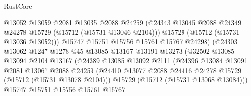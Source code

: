 \begin{lexlean}{RustCore}
\begin{coremodule}
                                  @13052
                                  @13059
                                  @2081
                                  @13035
                                  @2088
                                  @24259
                                  (@24343
                                    @13045
                                    @2088
                                    @24349
                                    @24278
                                    @15729
                                    (@15712 (@15731 @13046 @2104)))
                                  @15729
                                  (@15712 (@15731 @13036 @13052)))
                                @15747
                                @15751
                                @15756
                                @15761
                                @15767
                                @24298)
                              (@24303
                                @13062
                                @1247
                                @1278
                                @45
                                @13085
                                @13167
                                @13191
                                @13273
                                (@32502
                                  @13085
                                  @13094
                                  @2104
                                  @13167
                                  (@24389
                                    @13085
                                    @13092
                                    @2111
                                    (@24396
                                      @13084
                                      @13091
                                      @2081
                                      @13067
                                      @2088
                                      @24259
                                      (@24410
                                        @13077
                                        @2088
                                        @24416
                                        @24278
                                        @15729
                                        (@15712 (@15731 @13078 @2104)))
                                      @15729
                                      (@15712 (@15731 @13068 @13084)))
                                    @15747
                                    @15751
                                    @15756
                                    @15761
                                    @15767

\end{coremodule}
\end{lexlean}
